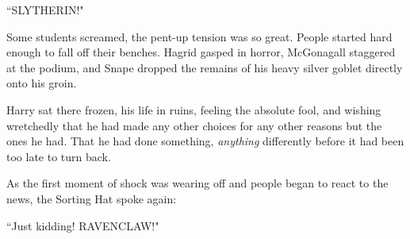 ``SLYTHERIN!"

Some students screamed, the pent-up tension was so great. People started hard enough to fall off their benches. Hagrid gasped in horror, McGonagall staggered at the podium, and Snape dropped the remains of his heavy silver goblet directly onto his groin.

Harry sat there frozen, his life in ruins, feeling the absolute fool, and wishing wretchedly that he had made any other choices for any other reasons but the ones he had. That he had done something, \emph{anything} differently before it had been too late to turn back.

As the first moment of shock was wearing off and people began to react to the news, the Sorting Hat spoke again:

``Just kidding! RAVENCLAW!"

